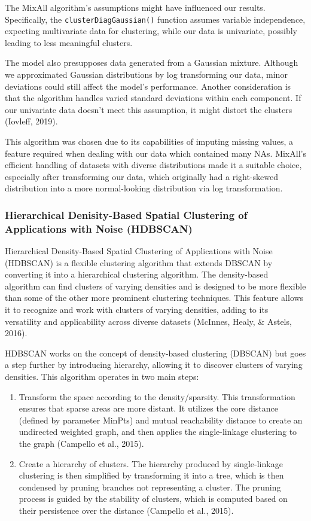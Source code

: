 \documentclass[11pt, a4paper]{article}
\begin{document}
The MixAll algorithm's assumptions might have influenced our results. Specifically, the \texttt{clusterDiagGaussian()} function assumes variable independence, expecting multivariate data for clustering, while our data is univariate, possibly leading to less meaningful clusters.
\par
The model also presupposes data generated from a Gaussian mixture. Although we approximated Gaussian distributions by log transforming our data, minor deviations could still affect the model's performance. Another consideration is that the algorithm handles varied standard deviations within each component. If our univariate data doesn't meet this assumption, it might distort the clusters (Iovleff, 2019).
\par
This algorithm was chosen due to its capabilities of imputing missing values, a feature required when dealing with our data which contained many NAs. MixAll's efficient handling of datasets with diverse distributions made it a suitable choice, especially after transforming our data, which originally had a right-skewed distribution into a more normal-looking distribution via log transformation.






\subsubsection{Hierarchical Denisity-Based Spatial Clustering of Applications with Noise (HDBSCAN)}


Hierarchical Density-Based Spatial Clustering of Applications with Noise (HDBSCAN) is a flexible clustering algorithm  that extends DBSCAN by converting it into a hierarchical clustering algorithm. The density-based algorithm can find clusters of varying densities and is designed to be more flexible than some of the other more prominent clustering techniques. This feature allows it to recognize and work with clusters of varying densities, adding to its versatility and applicability across diverse datasets (McInnes, Healy, \& Astels, 2016).
\par
HDBSCAN works on the concept of density-based clustering (DBSCAN) but goes a step further by introducing hierarchy, allowing it to discover clusters of varying densities. This algorithm operates in two main steps:
\begin{enumerate}
\item Transform the space according to the density/sparsity. This transformation ensures that sparse areas are more distant. It utilizes the core distance (defined by parameter MinPts) and mutual reachability distance to create an undirected weighted graph, and then applies the single-linkage clustering to the graph (Campello et al., 2015).
\item Create a hierarchy of clusters. The hierarchy produced by single-linkage clustering is then simplified by transforming it into a tree, which is then condensed by pruning branches not representing a cluster. The pruning process is guided by the stability of clusters, which is computed based on their persistence over the distance (Campello et al., 2015).
\end{enumerate}
\end{document}

